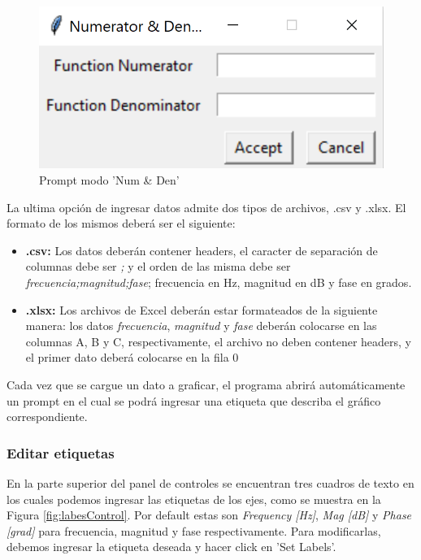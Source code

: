 \documentclass[10pt,a4paper]{article}
\begin{document}
\begin{figure}[ht]
\centering
\includegraphics[scale=0.3]{resources/numDenPrompt.png}
\caption{Prompt modo 'Num \& Den'}
\label{fig:numDenPrompt}
\end{figure}

La ultima opción de ingresar datos admite dos tipos de archivos, .csv y .xlsx. El formato de los mismos deberá ser el siguiente:
\begin{itemize}
\item \textbf{.csv: }Los datos deberán contener headers, el caracter de separación de columnas debe ser \emph{;} y el orden de las misma debe ser \emph{frecuencia;magnitud;fase}; frecuencia en Hz, magnitud en dB y fase en grados.
\item \textbf{.xlsx: }Los archivos de Excel deberán estar formateados de la siguiente manera: los datos \emph{frecuencia}, \emph{magnitud} y \emph{fase} deberán colocarse en las columnas A, B y C, respectivamente, el archivo no deben contener headers, y el primer dato deberá colocarse en la fila 0
\end{itemize}

Cada vez que se cargue un dato a graficar, el programa abrirá automáticamente un prompt en el cual se podrá ingresar una etiqueta que describa el gráfico correspondiente.

\subsubsection{Editar etiquetas}

En la parte superior del panel de controles se encuentran tres cuadros de texto en los cuales podemos ingresar las etiquetas de los ejes, como se muestra en la Figura \ref{fig:labesControl}. Por default estas son \emph{Frequency [Hz]}, \emph{Mag [dB]} y \emph{Phase [grad]} para frecuencia, magnitud y fase respectivamente. Para modificarlas, debemos ingresar la etiqueta deseada y hacer click en 'Set Labels'.
\end{document}
